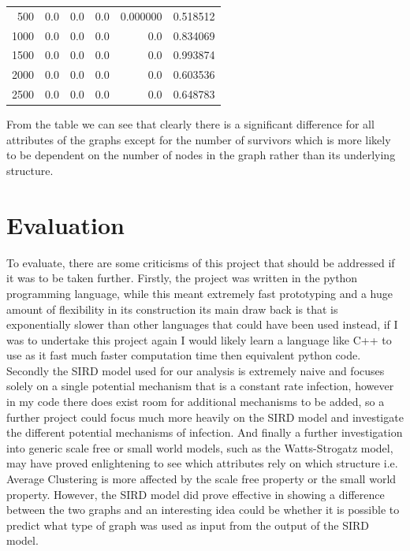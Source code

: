 \documentclass{article}
\begin{document}
\begin{tabular}{rrrrrr}
                500 &             0.0 &                    0.0 &                 0.0 &    0.000000 &   0.518512 \\
                1000 &             0.0 &                    0.0 &                 0.0 &         0.0 &   0.834069 \\
                1500 &             0.0 &                    0.0 &                 0.0 &         0.0 &   0.993874 \\
                2000 &             0.0 &                    0.0 &                 0.0 &         0.0 &   0.603536 \\
                2500 &             0.0 &                    0.0 &                 0.0 &         0.0 &   0.648783 \\
                \bottomrule
            \end{tabular}
            From the table we can see that clearly there is a significant difference for all attributes of the graphs except for the number of survivors which is more likely to be dependent on the number of nodes in the graph rather than its underlying structure.
    \section{Evaluation}
    To evaluate, there are some criticisms of this project that should be addressed if it was to be taken further. Firstly, the project was written in the python programming language, while this meant extremely fast prototyping and a huge amount of flexibility in its construction its main draw back is that is exponentially slower than other languages that could have been used instead, if I was to undertake this project again I would likely learn a language like C++ to use as it fast much faster computation time then equivalent python code. Secondly the SIRD model used for our analysis is extremely naive and focuses solely on a single potential mechanism that is a constant rate infection, however in my code there does exist room for additional mechanisms to be added, so a further project could focus much more heavily on the SIRD model and investigate the different potential mechanisms of infection. And finally a further investigation into generic scale free or small world models, such as the Watts-Strogatz model, may have proved enlightening to see which attributes rely on which structure i.e. Average Clustering is more affected by the scale free property or the small world property. However, the SIRD model did prove effective in showing a difference between the two graphs and an interesting idea could be whether it is possible to predict what type of graph was used as input from the output of the SIRD model.
\end{document}
